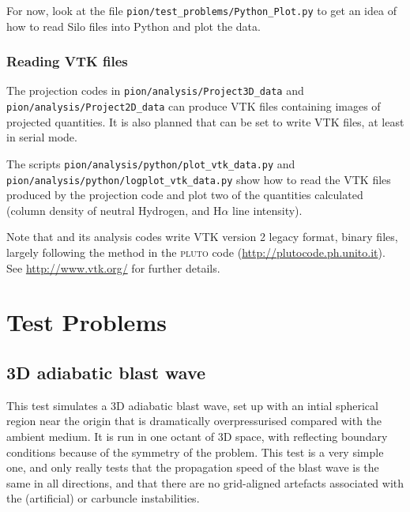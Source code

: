 \documentclass[a4paper,11pt]{report}
\begin{document}
For now, look at the file \lstinline{pion/test_problems/Python_Plot.py} to get an idea of how to read Silo files into Python and plot the data.

\subsection{Reading VTK files}
The projection codes in \lstinline{pion/analysis/Project3D_data} and \lstinline{pion/analysis/Project2D_data} can produce VTK files containing images of projected quantities.
It is also planned that \pion{} can be set to write VTK files, at least in serial mode.

The scripts \lstinline{pion/analysis/python/plot_vtk_data.py} and \lstinline{pion/analysis/python/logplot_vtk_data.py} show how to read the VTK files produced by the projection code and plot two of the quantities calculated (column density of neutral Hydrogen, and H$\alpha$ line intensity).

Note that \pion{} and its analysis codes write VTK version 2 legacy format, binary files, largely following the method in the \textsc{pluto} code (\href{http://plutocode.ph.unito.it}{http://plutocode.ph.unito.it}).
See \href{http://www.vtk.org/}{http://www.vtk.org/} for further details.



\chapter{Test Problems}

\section{3D adiabatic blast wave}
\label{sec:test:bw3d}
This test simulates a 3D adiabatic blast wave, set up with an intial spherical region near the origin that is dramatically overpressurised compared with the ambient medium.
It is run in one octant of 3D space, with reflecting boundary conditions because of the symmetry of the problem.
This test is a very simple one, and only really tests that the propagation speed of the blast wave is the same in all directions, and that there are no grid-aligned artefacts associated with the (artificial) \citet{Qui94} or carbuncle instabilities.
\end{document}
